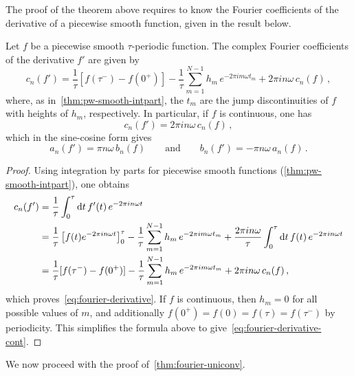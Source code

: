 The proof of the theorem above requires to know the Fourier coefficients of the derivative
of a piecewise smooth function, given in the result below.
\begin{theorem}
	Let $f$ be a piecewise smooth $\tau$-periodic function. The complex Fourier coefficients
	of the derivative $f'$ are given by
	\begin{equation}
		c_n(f')=\frac{1}{\tau}[f(\tau^-)-f(0^+)]
		-\frac{1}{\tau}\sum_{m=1}^{N-1}h_m\,e^{-2\pi im\omega t_m}
		+2\pi i n\omega\,c_n(f)\,,\label{eq:fourier-derivative}
	\end{equation}
	where, as in~\cref{thm:pw-smooth-intpart}, the $t_m$ are the jump discontinuities of $f$
	with heights of $h_m$, respectively.  In particular, if $f$ is continuous, one has
	\begin{equation}
		c_n(f')=2\pi i n\omega\,c_n(f)\,,\label{eq:fourier-derivative-cont}
	\end{equation}
	which in the sine-cosine form gives
	\begin{equation}
		a_n(f')=\pi n\omega\,b_n(f)\qquad\text{and}\qquad b_n(f')=-\pi n\omega\,a_n(f)\,.
	\end{equation}
\end{theorem}
\begin{proof}
	Using integration by parts for piecewise smooth functions
	(\cref{thm:pw-smooth-intpart}), one obtains
	\begin{align}
		c_n(f') & =\frac{1}{\tau}\int_0^\tau\mathrm{d} t\,f'(t)\,e^{-2\pi i n\omega t}   \notag \\
		        & =\frac{1}{\tau}\left[f(t)e^{-2\pi i n\omega t}\right]_0^\tau
		-\frac{1}{\tau}\sum_{m=1}^{N-1}h_m\,e^{-2\pi im\omega t_m}
		+\frac{2\pi i n\omega}{\tau}\int_0^\tau\mathrm{d} t\,f(t)\,e^{-2\pi i n\omega t} \notag \\
		        & =\frac{1}{\tau}[f(\tau^-)-f(0^+)]
		-\frac{1}{\tau}\sum_{m=1}^{N-1}h_m\,e^{-2\pi im\omega t_m}
		+2\pi i n\omega\,c_n(f)\,,
	\end{align}
	which proves~\cref{eq:fourier-derivative}. If $f$ is continuous, then $h_m=0$ for all
	possible values of $m$, and additionally $f(0^+)=f(0)=f(\tau)=f(\tau^-)$ by periodicity.
	This simplifies the formula above to give~\cref{eq:fourier-derivative-cont}.
\end{proof}
We now proceed with the proof of~\cref{thm:fourier-uniconv}.
